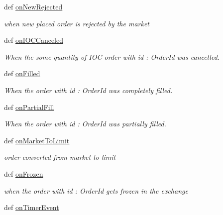\begin{DoxyCompactItemize}
def \hyperlink{classmuTradePyBase_1_1CustomStrategy_a37168737333e7a2f24523729b472a923}{on\-New\-Rejected}
\begin{DoxyCompactList}\small\item\em when new placed order is rejected by the market \end{DoxyCompactList}\item 
def \hyperlink{classmuTradePyBase_1_1CustomStrategy_a925b4e45e1e2154cfe8ab4fc537fc9a6}{on\-I\-O\-C\-Canceled}
\begin{DoxyCompactList}\small\item\em When the some quantity of I\-O\-C order with id \-: Order\-Id was cancelled. \end{DoxyCompactList}\item 
def \hyperlink{classmuTradePyBase_1_1CustomStrategy_a47a2cb28592cf7c86df3bb115ca71e80}{on\-Filled}
\begin{DoxyCompactList}\small\item\em When the order with id \-: Order\-Id was completely filled. \end{DoxyCompactList}\item 
def \hyperlink{classmuTradePyBase_1_1CustomStrategy_a0f72b6e5d904bba083ef8fb40f0252f0}{on\-Partial\-Fill}
\begin{DoxyCompactList}\small\item\em When the order with id \-: Order\-Id was partially filled. \end{DoxyCompactList}\item 
def \hyperlink{classmuTradePyBase_1_1CustomStrategy_a84ad201271dca01c3753844427013726}{on\-Market\-To\-Limit}
\begin{DoxyCompactList}\small\item\em order converted from market to limit \end{DoxyCompactList}\item 
def \hyperlink{classmuTradePyBase_1_1CustomStrategy_a99f58611a2483c2015b219abdee61962}{on\-Frozen}
\begin{DoxyCompactList}\small\item\em when the order with id \-: Order\-Id gets frozen in the exchange \end{DoxyCompactList}\item 
\hypertarget{classmuTradePyBase_1_1CustomStrategy_a5dfc1f4f597d7d34962d5f7339d54e9f}{def \hyperlink{classmuTradePyBase_1_1CustomStrategy_a5dfc1f4f597d7d34962d5f7339d54e9f}{on\-Timer\-Event}}\label{classmuTradePyBase_1_1CustomStrategy_a5dfc1f4f597d7d34962d5f7339d54e9f}


\end{DoxyCompactItemize}
